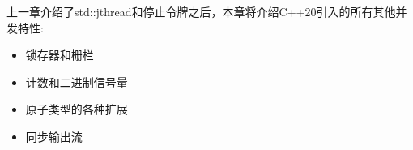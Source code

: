
上一章介绍了std::jthread和停止令牌之后，本章将介绍C++20引入的所有其他并发特性:

\begin{itemize}
\item 
锁存器和栅栏

\item 
计数和二进制信号量

\item 
原子类型的各种扩展

\item 
同步输出流
\end{itemize}